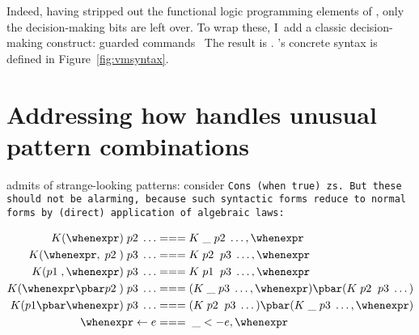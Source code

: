 \documentclass[manuscript,screen,review, 12pt, nonacm]{acmart}
\begin{document}









Indeed, having stripped out the functional logic programming elements of
\VC, only the decision-making bits are left over. To wrap these, I~add a
classic decision-making construct: guarded commands~\citep{dijkstra} The result is \VMinus. \VMinus's concrete syntax is
defined in Figure~\ref{fig:vmsyntax}. 

\section{Addressing how \PPlus handles unusual pattern combinations}
\label{ppweird}
    \PPlus admits of strange-looking patterns: consider \tt{Cons (when true)
    zs}. But these should not be alarming, because such syntactic forms reduce
    to normal forms by (direct) application of algebraic laws: 

    \begin{align}
      K (\whenexpr) \;p2\; \dots &=== K \;\_ \;p2\; \dots, \whenexpr \\
      K (\whenexpr, \;p2\;) \;p3\; \dots  &=== K \;p2\; \;p3\; \dots, \whenexpr \\
      K (p1\;, \whenexpr) \;p3\; \dots  &=== K \;p1\; \;p3\; \dots, \whenexpr \\
      K (\whenexpr \pbar p2\;) \;p3\; \dots &=== (K \;\_ \;p3\; \dots, \whenexpr) \pbar (K \;p2\; \;p3\; \dots) \\
      K (p1 \pbar \whenexpr) \;p3\; \dots &=== (K \;p2\; \;p3\; \dots) \pbar (K \;\_ \;p3\; \dots, \whenexpr)  \\
      \whenexpr \leftarrow e &=== \;\_ <- e, \whenexpr
    \end{align}   
    
\end{document}
